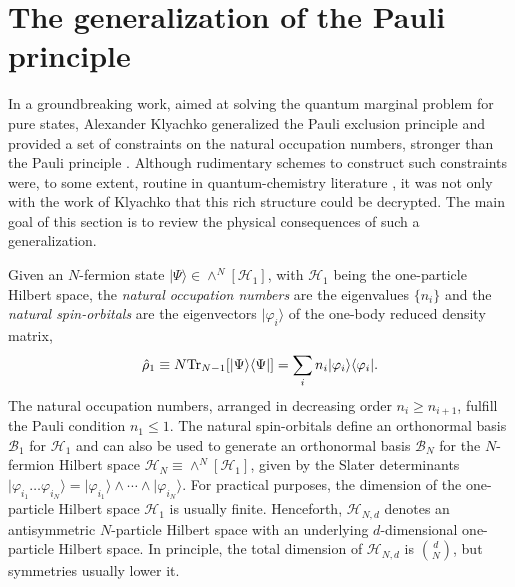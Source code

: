 \documentclass[aps,twocolumn,showpacs,pra,superscriptaddress,floatfix,longbibliography]{revtex4-1}
\newcommand{\7}{\dagger}
\newcommand{\ket}[1]{\mbox{$| #1 \rangle$}}
\renewcommand{\H}{\mathcal{H}}
\begin{document}
\section{The generalization of the Pauli principle}
\label{sec:gpep}

In a groundbreaking work, aimed at solving the quantum 
marginal problem for pure states, Alexander Klyachko 
generalized the Pauli exclusion principle and
provided a set of constraints on the natural 
occupation numbers, stronger than the Pauli 
principle  \cite{Kly2}. Although rudimentary schemes 
to construct such constraints were, to some extent, 
routine in quantum-chemistry literature \cite{Mullern}, 
it was not only with the work of Klyachko that this 
rich structure could be decrypted. 
The main goal of this section is to review the physical 
consequences of such a generalization. 

Given an $N$-fermion state $\ket{\Psi}\in \wedge^N[\H_1]$, 
with $\H_1$ being the one-particle Hilbert space, the \textit{natural
occupation numbers} are the eigenvalues $\{n_{i}\}$ and the 
\textit{natural spin-orbitals} are the eigenvectors $\ket{\varphi_i}$ 
of the one-body reduced density matrix,
\begin{align}
\label{1rdo}
\hat\rho_1\equiv N { \rm Tr}_{N-1}[\ket{\Psi}\langle\Psi|] =
\sum_{i}n_i\ket{\varphi_i}\langle \varphi_i|.
\end{align}
The natural occupation numbers, arranged in 
decreasing order $n_{i} \geq n_{i+1}$, 
 fulfill the Pauli condition $n_1 \leq
1$. The natural spin-orbitals define an orthonormal 
basis $\mathcal{B}_1$ for $\H_1$ and can also be 
used to generate an orthonormal basis 
$\mathcal{B}_N$ for the $N$-fermion Hilbert space 
$\H_N \equiv \wedge^N[\H_1]$, given by the Slater 
determinants
$\ket{\varphi_{i_1}\ldots\varphi_{i_N}} = 
  \ket{\varphi_{i_1}}\wedge \cdots\wedge\ket{\varphi_{i_N}}.$
For practical purposes, the dimension of the one-particle Hilbert
space $\H_1$ is usually finite. Henceforth,
$\H_{N,d}$
denotes an antisymmetric $N$-particle Hilbert space 
with an underlying $d$-dimensional one-particle Hilbert 
space. In principle, the total dimension of
$\H_{N,d}$ is $\binom{d}{N}$, but symmetries 
usually lower it.
\end{document}
